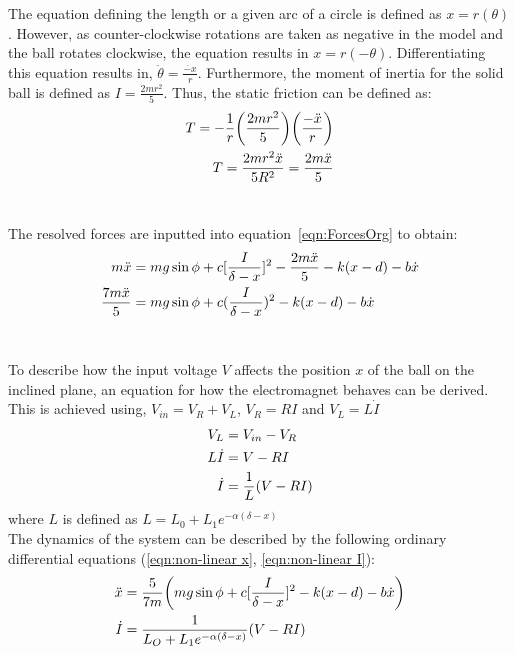 \documentclass[a4paper,10pt,reqno]{amsart}
\numberwithin{equation}{section}
\begin{document}
\newpage
The equation defining the length or a given arc of a circle is defined as $x=r(\theta)$. However, as counter-clockwise rotations are taken as negative in the model and the ball rotates clockwise, the equation results in  $x=r(-\theta)$. Differentiating this equation results in, $\ddot{\theta}=\frac{\ddot{-x}}{r}$. Furthermore, the moment of inertia for the solid ball is defined as $I=\frac{2mr^2}{5}$. Thus, the static friction can be defined as:
\begin{align}
    T=-\frac{1}{r}\bigg(\frac{2mr^2}{5}\bigg)\bigg(\frac{-\ddot{x}}{r}\bigg)
    \notag\\
    T = \frac{2mr^2\ddot{x}}{5R^2} = \frac{2m\ddot{x}}{5}
\end{align}
\\
\par The resolved forces are inputted into equation~\ref{eqn:ForcesOrg} to obtain:
\begin{align}
    m\ddot{x} &{}={} mg\sin{\phi}+c[\frac{I}{\delta-x}]^2-\frac{2m\ddot{x}}{5}-k(x-d)-b\dot{x}
    \notag
    \\
    \frac{7m\ddot{x}}{5} &{}={} mg\sin{\phi}+c(\frac{I}{\delta-x})^2-k(x-d)-b\dot{x}
    \label{eqn:non-linear x}
\end{align}
\\
\par To describe how the input voltage $V$ affects the position $x$ of the ball on the inclined plane, an equation for how the electromagnet behaves can be derived. This is achieved using, $V_{in}=V_R+V_L$, $V_R=RI$ and $V_L=L\dot{I}$
\begin{align}
    V_L&{}={}V_{in}-V_R
    \notag\\
    L\dot{I}&{}={}V-RI
    \notag\\
    \dot{I}&{}={}\frac{1}{L}(V-RI)
    \label{eqn:non-linear I}
\end{align}
where $L$ is defined as $L= L_0 +L_1e^{-\alpha(\delta-x)}$
\\


The dynamics of the system can be described by the following ordinary differential equations (\ref{eqn:non-linear x}, \ref{eqn:non-linear I}):
\begin{subequations}\label{eqn:non-linear sys}
\begin{align} 
    \ddot{x}&{}={}\frac{5}{7m}\bigg(mg\sin{\phi}+c[\frac{I}{\delta-x}]^2-k(x-d)-b\dot{x}\bigg)
    \\
    \dot{I}&{}={}\frac{1}{L_O+L_1e^{-\alpha(\delta-x)}}(V-RI)
    \\
    \notag
\end{align}
\end{subequations}
\end{document}
